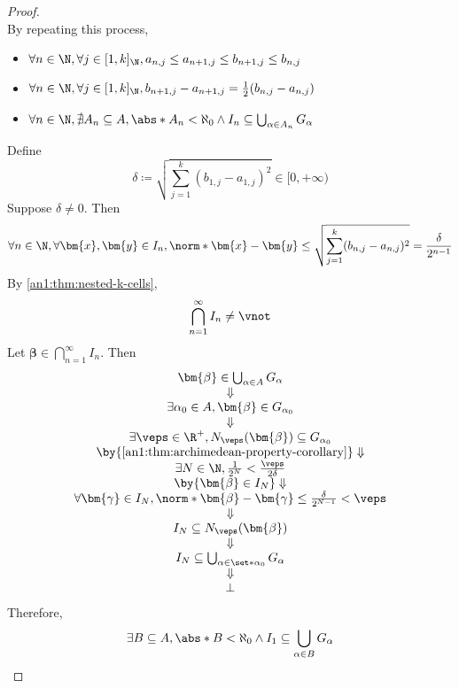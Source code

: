 \begin{proof}
\[  \]
  By repeating this process,
  \begin{itemize}
    \item $\forall n \in \N, \forall j \in [1, k]_{\N}, a_{n, j} \leq a_{n + 1, j} \leq b_{n + 1, j} \leq b_{n, j}$
    \item $\forall n \in \N, \forall j \in [1, k]_{\N}, b_{n + 1, j} - a_{n + 1, j} = \frac{1}{2}(b_{n, j} - a_{n, j})$
    \item $\forall n \in \N, \nexists A_{n} \subseteq A, \abs*{A_{n}} < \aleph_{0}
            \land I_{n} \subseteq \bigcup_{\alpha \in A_{n}} G_{\alpha}$
  \end{itemize}
  Define
  \[
    \delta \coloneqq \sqrt{\sum_{j = 1}^{k} (b_{1, j} - a_{1, j})^{2}} \in [0, + \infty)
  \]
  Suppose $\delta \neq 0$. Then
  \[
    \forall n \in \N, \forall \bm{x}, \bm{y} \in I_{n}, \norm*{\bm{x} - \bm{y}}
    \leq \sqrt{\sum_{j = 1}^{k} (b_{n, j} - a_{n, j})^{2}} = \frac{\delta}{2^{n - 1}}
  \]
  By \cref{an1:thm:nested-k-cells},
  \[
    \bigcap_{n = 1}^{\infty} I_{n} \neq \vnot
  \]
  Let $\bm{\beta} \in \bigcap_{n = 1}^{\infty} I_{n}$. Then
  \[
    \begin{array}{c}
      \bm{\beta} \in \bigcup_{\alpha \in A} G_{\alpha}                         \\
      \Downarrow                                                               \\
      \exists \alpha_{0} \in A, \bm{\beta} \in G_{\alpha_{0}}                  \\
      \Downarrow                                                               \\
      \exists \veps \in \R^{+}, N_{\veps}(\bm{\beta}) \subseteq G_{\alpha_{0}} \\
      \by{\Cref{an1:thm:archimedean-property-corollary}} \Downarrow            \\
      \exists N \in \N, \frac{1}{2^{N}} < \frac{\veps}{2\delta}                \\
      \by{\ensuremath{\bm{\beta} \in I_{N}}} \Downarrow                        \\
      \forall \bm{\gamma} \in I_{N}, \norm*{\bm{\beta} - \bm{\gamma}}
      \leq \frac{\delta}{2^{N - 1}} < \veps                                    \\
      \Downarrow                                                               \\
      I_{N} \subseteq N_{\veps}(\bm{\beta})                                    \\
      \Downarrow                                                               \\
      I_{N} \subseteq \bigcup_{\alpha \in \set*{\alpha_{0}}} G_{\alpha}        \\
      \Downarrow                                                               \\
      \bot
    \end{array}
  \]
  Therefore,
  \[
    \exists B \subseteq A, \abs*{B} < \aleph_{0} \land I_{1} \subseteq \bigcup_{\alpha \in B} G_{\alpha}
  \]
\end{proof}

